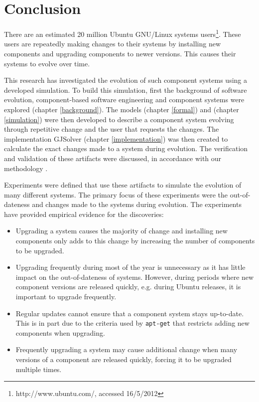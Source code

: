 \chapter{Conclusion}
\label{conclusion}
There are an estimated 20 million Ubuntu GNU/Linux systems users\footnote{http://www.ubuntu.com/, accessed 16/5/2012}.
These users are repeatedly making changes to their systems by installing new components and upgrading components to newer versions.
This causes their systems to evolve over time.

This research has investigated the evolution of such component systems using a developed simulation.
To build this simulation, first the background of software evolution, component-based software engineering and component systems were explored (chapter \ref{background}).
The models \modelname (chapter \ref{formal}) and \usermodel (chapter \ref{simulation}) were then developed 
to describe a component system evolving through repetitive change and the user that requests the changes.
The implementation GJSolver (chapter \ref{implementation}) was then created to calculate the exact changes made to a system during evolution.
The verification and validation of these artifacts were discussed, in accordance with our methodology \cite{Law2005}.

Experiments were defined that use these artifacts to simulate the evolution of many different systems.
The primary focus of these experiments were the out-of-dateness and changes made to the systems during evolution.
The experiments have provided empirical evidence for the discoveries:
\begin{itemize}
  \item Upgrading a system causes the majority of change 
  and installing new components only adds to this change by increasing the number of components to be upgraded.
  \item Upgrading frequently during most of the year is unnecessary as it has little impact on the out-of-dateness of systems.
  However, during periods where new component versions are released quickly, e.g. during Ubuntu releases, 
  it is important to upgrade frequently. 
  \item Regular updates cannot ensure that a component system stays up-to-date.
  This is in part due to the criteria used by \texttt{apt-get} that restricts adding new components when upgrading.
  \item Frequently upgrading a system may cause additional change 
  when many versions of a component are released quickly, forcing it to be upgraded multiple times.
\end{itemize} 

